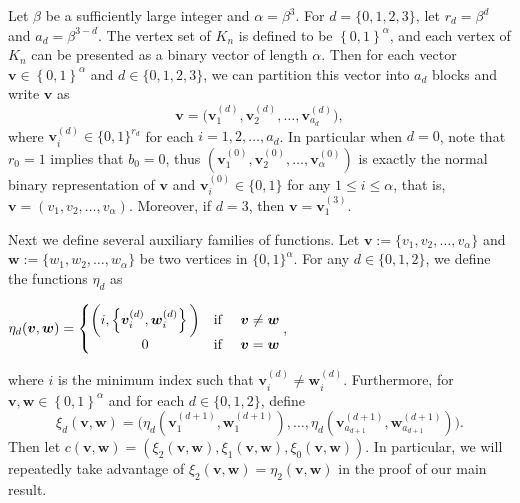 \documentclass[11pt]{article}
\theoremstyle{definition}
\begin{document}
Let $\beta$ be a sufficiently large integer and $\alpha=\beta^{3}$. For $d=\{0,1,2,3\}$, let $r_{d}=\beta^{d}$ and $a_{d}=\beta^{3-d}$. The vertex set of $K_{n}$ is defined to be $\left\{0,1\right\}^\alpha$, and each vertex of $K_n$ can be presented as a binary vector of length $\alpha$. Then for each vector $\boldsymbol{v}\in \left\{0,1 \right\}^{\alpha}$ and $d\in\{0,1,2,3\}$, we can partition this vector into $a_{d}$ blocks and write $\boldsymbol{v}$ as 
\begin{equation*}
    \boldsymbol{v}=\big(\boldsymbol{v}_{1}^{(d)},\boldsymbol{v}_2^{(d)},\ldots,\boldsymbol{v}_{a_{d}}^{(d)}\big),
\end{equation*}
where $\boldsymbol{v}_{i}^{(d)}\in\{0,1\}^{r_{d}}$ for each $i=1,2,\ldots,a_{d}$. In particular when $d=0$, note that $r_{0}=1$ implies that $b_{0}=0$, thus $(\boldsymbol{v}_{1}^{(0)},\boldsymbol{v}_2^{(0)},\ldots,\boldsymbol{v}_{\alpha}^{(0)})$ is exactly the normal binary representation of $\boldsymbol{v}$ and $\boldsymbol{v}_{i}^{(0)}\in\{0,1\}$ for any $1\le i\le\alpha$, that is, $\boldsymbol{v}=(v_{1},v_{2},\ldots,v_{\alpha})$. Moreover, if $d=3$, then $\boldsymbol{v}=\boldsymbol{v}_{1}^{(3)}$.


Next we define several auxiliary families of functions. Let $\boldsymbol{v}:=\{v_{1},v_{2},\ldots,v_{\alpha}\}$ and $\boldsymbol{w}:=\{w_{1},w_{2},\ldots,w_{\alpha}\}$ be two vertices in $\{0,1\}^{\alpha}$. For any $d\in\{0,1,2\}$, we define the functions $\eta_{d}$ as
\begin{center}
    $\eta_{d}(\boldsymbol{v},\boldsymbol{w})=\left\{\begin{matrix}
 \bigg(i,\left\{\boldsymbol{v}_{i}^{(d)},\boldsymbol{w}_i^{(d)} \right\}\bigg)&\textup{if } &\boldsymbol{v}\neq\boldsymbol{w} \\
 0 & \textup{if } &\boldsymbol{v}=\boldsymbol{w} \\
\end{matrix}\right.$,
\end{center}
where $i$ is the minimum index such that $\boldsymbol{v}_i^{(d)}\neq \boldsymbol{w}_i^{(d)}$. Furthermore, for $\boldsymbol{v},\boldsymbol{w}\in \left\{0,1 \right\}^\alpha$ and for each $d\in\{0,1,2\}$, define
\begin{equation*}
    \xi_{d}(\boldsymbol{v},\boldsymbol{w})=\bigg(\eta_{d}(\boldsymbol{v}_{1}^{(d+1)},\boldsymbol{w}_{1}^{(d+1)}),\ldots,\eta_{d}(\boldsymbol{v}_{a_{d+1}}^{(d+1)},\boldsymbol{w}_{a_{d+1}}^{(d+1)})\bigg).
\end{equation*}
Then let $c(\boldsymbol{v},\boldsymbol{w})=(\xi_{2}(\boldsymbol{v},\boldsymbol{w}),\xi_{1}(\boldsymbol{v},\boldsymbol{w}),\xi_{0}(\boldsymbol{v},\boldsymbol{w}))$. In particular, we will repeatedly take advantage of $\xi_{2}(\boldsymbol{v},\boldsymbol{w})=\eta_{2}(\boldsymbol{v},\boldsymbol{w})$ in the proof of our main result.
\end{document}
